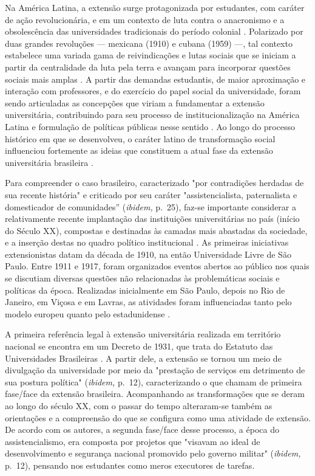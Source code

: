 \documentclass[portuguese]{textolivre}
\begin{document}
Na América Latina, a extensão surge protagonizada por estudantes, com
caráter de ação revolucionária, e em um contexto de luta contra o
anacronismo e a obsolescência das universidades tradicionais do período
colonial \cite{Oliveira2015,Paula2013}. Polarizado por duas
grandes revoluções --- mexicana (1910) e cubana (1959) ---, tal contexto
estabelece uma variada gama de reivindicações e lutas sociais que se
iniciam a partir da centralidade da luta pela terra e avançam para
incorporar questões sociais mais amplas \cite{Paula2013}. A partir das
demandas estudantis, de maior aproximação e interação com professores, e
do exercício do papel social da universidade, foram sendo articuladas as
concepções que viriam a fundamentar a extensão universitária,
contribuindo para seu processo de institucionalização na América Latina
e formulação de políticas públicas nesse sentido \cite{Gomez2019}. Ao
longo do processo histórico em que se desenvolveu, o caráter latino de
transformação social influenciou fortemente as ideias que constituem a
atual fase da extensão universitária brasileira \cite{Oliveira2015}.

Para compreender o caso brasileiro, caracterizado "por contradições
herdadas de sua recente história" \cite[p.~24]{Carbonari2007} e
criticado por seu caráter "assistencialista, paternalista e domesticador
de comunidades'' (\emph{ibidem, }p.~25), faz-se importante considerar a
relativamente recente implantação das instituições universitárias no
país (início do Século XX), compostas e destinadas às camadas mais
abastadas da sociedade, e a inserção destas no quadro político
institucional \cite{Gomez2019}. As primeiras iniciativas extensionistas
datam da década de 1910, na então Universidade Livre de São Paulo. Entre
1911 e 1917, foram organizados eventos abertos ao público nos quais se
discutiam diversas questões não relacionadas às problemáticas sociais e
políticas da época. Realizadas inicialmente em São Paulo, depois no Rio
de Janeiro, em Viçosa e em Lavras, as atividades foram influenciadas
tanto pelo modelo europeu quanto pelo estadunidense
\cite{Carbonari2007, Oliveira2015, Paula2013}.

A primeira referência legal à extensão universitária realizada em
território nacional se encontra em um Decreto de 1931, que trata do
Estatuto das Universidades Brasileiras \cite{Oliveira2015}. A partir
dele, a extensão se tornou um meio de divulgação da universidade por
meio da "prestação de serviços em detrimento de sua postura política"
(\emph{ibidem, }p.~12), caracterizando o que \textcite{Oliveira2015}
chamam de primeira fase/face da extensão brasileira. Acompanhando as
transformações que se deram ao longo do século XX, com o passar do tempo
alteraram-se também as orientações e a compreensão do que se configura
como uma atividade de extensão. De acordo com os autores, a segunda
fase/face desse processo, a época do assistencialismo, era composta por
projetos que "visavam ao ideal de desenvolvimento e segurança nacional
promovido pelo governo militar" (\emph{ibidem, }p.~12), pensando nos
estudantes como meros executores de tarefas.
\end{document}
